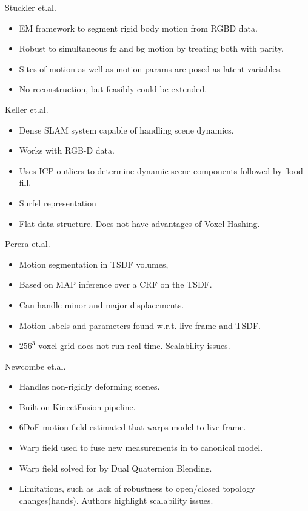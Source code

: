Stuckler et.al. \cite{Stueckler2013}
\begin{itemize}
	\item EM framework to segment rigid body motion from RGBD data.
	\item Robust to simultaneous fg and bg motion by treating both with parity.
	\item Sites of motion as well as motion params are posed as latent variables.
	\item No reconstruction, but feasibly could be extended.
\end{itemize}

Keller et.al. \cite{Keller2013}
\begin{itemize}
	\item Dense SLAM system capable of handling scene dynamics.
	\item Works with RGB-D data.
	\item Uses ICP outliers to determine dynamic scene components followed by flood fill.
	\item Surfel representation \cite{Pfister2000}
	\item Flat data structure. Does not have advantages of Voxel Hashing.
\end{itemize}

Perera et.al. \cite{Perera2015}
\begin{itemize}
	\item Motion segmentation in TSDF volumes,
	\item Based on MAP inference over a CRF on the TSDF.
	\item Can handle minor and major displacements.
	\item Motion labels and parameters found w.r.t. live frame and TSDF.
	\item $256^{3}$ voxel grid does not run real time. Scalability issues.
\end{itemize}

Newcombe et.al. \cite{Newcombe2015}
\begin{itemize}
	\item Handles non-rigidly deforming scenes.
	\item Built on KinectFusion pipeline.
	\item 6DoF motion field estimated that warps model to live frame.
	\item Warp field used to fuse new measurements in to canonical model.
	\item Warp field solved for by Dual Quaternion Blending. \cite{Kavan2006}
	\item Limitations, such as lack of robustness to open/closed topology changes(hands). Authors highlight scalability issues.
\end{itemize}

